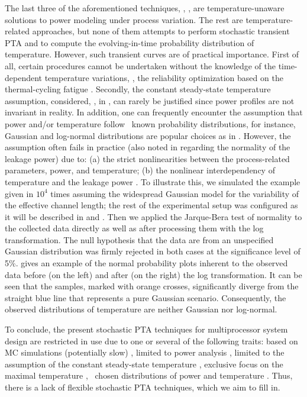 
The last three of the aforementioned techniques, \ie, \cite{shen2009, bhardwaj2006, ghanta2006}, are temperature-unaware solutions to power modeling under process variation.
The rest are temperature-related approaches, but none of them attempts to perform stochastic transient PTA and to compute the evolving-in-time probability distribution of temperature.
However, such transient curves are of practical importance.
First of all, certain procedures cannot be undertaken without the knowledge of the time-dependent temperature variations, \eg, the reliability optimization based on the thermal-cycling fatigue \cite{ukhov2012}.
Secondly, the constant steady-state temperature assumption, considered, \eg, in \cite{juan2011, juan2012}, can rarely be justified since power profiles are not invariant in reality.
In addition, one can frequently encounter the assumption that power and/or temperature follow \apriori\ known probability distributions, for instance, Gaussian and log-normal distributions are popular choices as in \cite{srivastava2010, juan2012, bhardwaj2006}.
However, the assumption often fails in practice (also noted in \cite{juan2012} regarding the normality of the leakage power) due to: (a) the strict nonlinearities between the process-related parameters, power, and temperature; (b) the nonlinear interdependency of temperature and the leakage power \cite{liu2007}.
To illustrate this, we simulated the example given in  $10^4$ times assuming the widespread Gaussian model for the variability of the effective channel length; the rest of the experimental setup was configured as it will be described in  and .
Then we applied the Jarque-Bera test of normality to the collected data directly as well as after processing them with the log transformation.
The null hypothesis that the data are from an unspecified Gaussian distribution was firmly rejected in both cases at the significance level of 5\%.
 gives an example of the normal probability plots inherent to the observed data before (on the left) and after (on the right) the log transformation.
It can be seen that the samples, marked with orange crosses, significantly diverge from the straight blue line that represents a pure Gaussian scenario.
Consequently, the observed distributions of temperature are neither Gaussian nor log-normal.

To conclude, the present stochastic PTA techniques for multiprocessor system design are restricted in use due to one or several of the following traits: based on MC simulations (potentially slow) \cite{chandra2010}, limited to power analysis \cite{chandra2010, shen2009, bhardwaj2006, ghanta2006}, limited to the assumption of the constant steady-state temperature \cite{juan2011, juan2012}, exclusive focus on the maximal temperature \cite{juan2011}, \apriori\ chosen distributions of power and temperature \cite{srivastava2010, juan2012, bhardwaj2006}.
Thus, there is a lack of flexible stochastic PTA techniques, which we aim to fill in.
